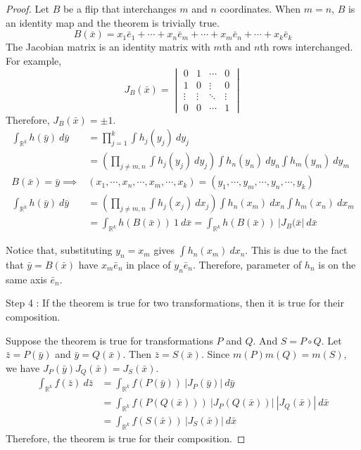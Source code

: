 \begin{proof}
	Let $B$ be a flip that interchanges $m$ and $n$ coordinates.
	When $m = n$, $B$ is an identity map and the theorem is trivially true.
	\begin{equation}
		B(\bar{x}) = x_1\bar{e}_1 + \cdots + x_n\bar{e}_m + \cdots +  x_m\bar{e}_n + \cdots + x_k\bar{e}_k
	\end{equation}
	The Jacobian matrix is an identity matrix with $m$th and $n$th rows interchanged.
	For example,
	\begin{equation}
		J_B(\bar{x}) = \begin{vmatrix}
			0 & 1 & \cdots & 0 \\
			1 & 0 & \vdots & 0 \\
			\vdots & \vdots & \ddots & \vdots \\
			0 & 0 & \cdots &  1
		\end{vmatrix}
	\end{equation}
	Therefore, $J_B(\bar{x}) = \pm 1$.
	\begin{align*}
		\int_{\mathbb{R}^k} h(\bar{y})\ d\bar{y} & = \prod_{j = 1}^k \int h_j(y_j)\ dy_j\\
		& = \left( \prod_{j \ne m,n} \int h_j(y_j)\ dy_j \right) \int h_n(y_n)\ dy_n \int h_m(y_m)\ dy_m \\
		B(\bar{x}) = \bar{y} \implies & (x_1,\cdots,x_n,\cdots,x_m,\cdots,x_k) = (y_1,\cdots,y_m,\cdots,y_n,\cdots,y_k)\\
		\int_{\mathbb{R}^k} h(\bar{y})\ d\bar{y} & = \left( \prod_{j \ne m,n} \int h_j(x_j)\ dx_j \right) \int h_n(x_m)\ dx_n \int h_m(x_n)\ dx_m \\
		& = \int_{\mathbb{R}^k} h(B(\bar{x}))\ 1\ d\bar{x} = \int_{\mathbb{R}^k} h(B(\bar{x}))\ |J_B(\bar{x}|\ d\bar{x}
	\end{align*}

	\begin{commentary}
		Notice that, substituting $y_n = x_m$ gives $\int h_n(x_m)\ dx_n$.
		This is due to the fact that $\bar{y} = B(\bar{x})$ have $x_m\bar{e}_n$ in place of $y_n\bar{e}_n$.
		Therefore, parameter of $h_n$ is on the same axis $\bar{e}_n$.

		Step 4 : If the theorem is true for two transformations, then it is true for their composition.
	\end{commentary}

	Suppose the theorem is true for transformations $P$ and $Q$.
	And $S = P \circ Q$.
	Let $\bar{z} = P(\bar{y})$ and $\bar{y} = Q(\bar{x})$.
	Then $\bar{z} = S(\bar{x})$.
	Since $m(P)m(Q) = m(S)$, we have $J_P(\bar{y}) J_Q(\bar{x}) = J_S(\bar{x})$.
	\begin{align*}
		\int_{\mathbb{R}^k} f(\bar{z})\ d\bar{z} & = \int_{\mathbb{R}^k} f(P(\bar{y}))\ |J_P(\bar{y})|\ d\bar{y} \\
		& = \int_{\mathbb{R}^k} f(P(Q(\bar{x})))\ |J_P(Q(\bar{x}))|\ |J_Q(\bar{x})|\ d\bar{x} \\
		& = \int_{\mathbb{R}^k} f(S(\bar{x}))\ |J_S(\bar{x})|\ d\bar{x}
	\end{align*}
	Therefore, the theorem is true for their composition.


\end{proof}
